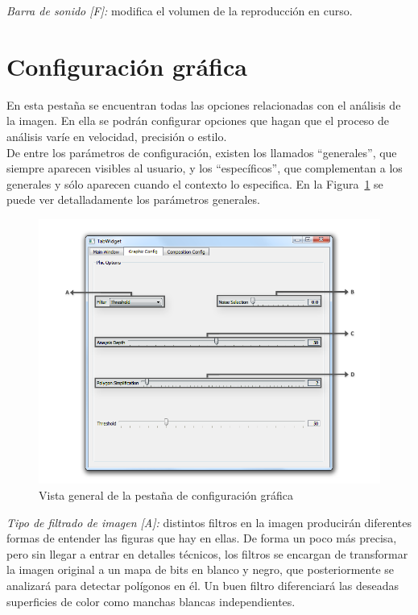 		\noindent\textit{Barra de sonido [F]:} modifica el volumen de la reproducción en curso.

		
	\section{Configuración gráfica}
		En esta pestaña se encuentran todas las opciones relacionadas con el análisis de la imagen. En ella se podrán configurar opciones que hagan que el proceso de análisis varíe en velocidad, precisión o estilo.\\
		
		De entre los parámetros de configuración, existen los llamados ``generales'', que siempre aparecen visibles al usuario, y los ``específicos'', que complementan a los generales y sólo aparecen cuando el contexto lo especifica. En la Figura~\ref{fig:interfazgraphic} se puede ver detalladamente los parámetros generales.\\
		
		\begin{figure}[htbp]
		\centering
		\hspace*{-0.45in}
		\includegraphics[scale=0.5]{graphics/interfazgraphic.png}
		\caption{Vista general de la pestaña de configuración gráfica}
		\label{fig:interfazgraphic}
		\end{figure}
		
		\noindent\textit{Tipo de filtrado de imagen [A]:} distintos filtros en la imagen producirán diferentes formas de entender las figuras que hay en ellas. De forma un poco más precisa, pero sin llegar a entrar en detalles técnicos, los filtros se encargan de transformar la imagen original a un mapa de bits en blanco y negro, que posteriormente se analizará para detectar polígonos en él. Un buen filtro diferenciará las deseadas superficies de color como manchas blancas independientes.\\
		
